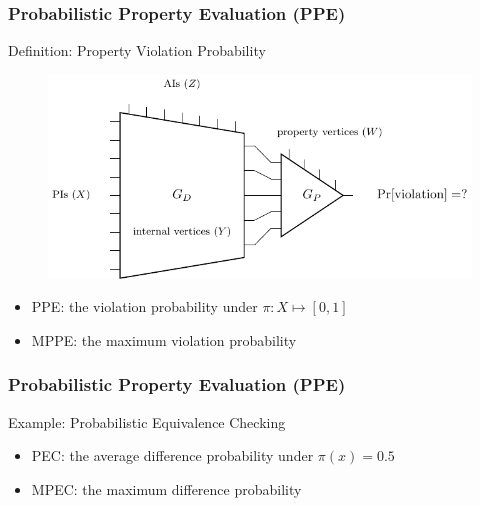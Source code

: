\begin{frame}
  \frametitle{Probabilistic Property Evaluation (PPE)}
  \begin{block}{Definition: Property Violation Probability}
    \begin{figure}
      \centering
      \includegraphics[scale=0.8]{fig/prob-design-eval/prob-spbn-miter.pdf}
    \end{figure}
    \pause
    \begin{itemize}
      \item PPE: the violation probability under $\pi:X\mapsto[0,1]$
            \pause
      \item MPPE: the maximum violation probability
    \end{itemize}
  \end{block}
\end{frame}

\begin{frame}
  \frametitle{Probabilistic Property Evaluation (PPE)}
  \begin{block}{Example: Probabilistic Equivalence Checking}
    \begin{figure}
      \centering
      
    \end{figure}
    \pause
    \begin{itemize}
      \item PEC: the average difference probability under $\pi(x)=0.5$
            \pause
      \item MPEC: the maximum difference probability
    \end{itemize}
  \end{block}
\end{frame}


